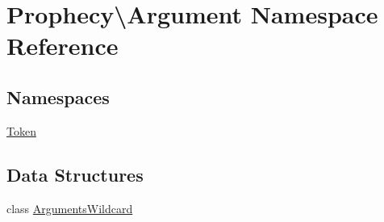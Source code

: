\hypertarget{namespace_prophecy_1_1_argument}{}\section{Prophecy\textbackslash{}Argument Namespace Reference}
\label{namespace_prophecy_1_1_argument}
\subsection*{Namespaces}
\begin{DoxyCompactItemize}
\item 
 \mbox{\hyperlink{namespace_prophecy_1_1_argument_1_1_token}{Token}}
\end{DoxyCompactItemize}
\subsection*{Data Structures}
\begin{DoxyCompactItemize}
\item 
class \mbox{\hyperlink{class_prophecy_1_1_argument_1_1_arguments_wildcard}{Arguments\+Wildcard}}
\end{DoxyCompactItemize}
